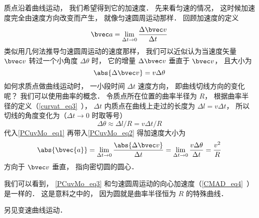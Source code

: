 


质点沿着曲线运动， 我们希望得到它的加速度． 先来看匀速的情况， 这时候加速度完全由速度方向改变而产生， 就像匀速圆周运动那样． 回顾加速度的定义
\begin{equation}\label{PCuvMo_eq2}
\bvec a = \lim_{\Delta t \to 0} \frac{\Delta \bvec v}{\Delta t}
\end{equation}
类似用几何法推导匀速圆周运动的速度那样， 我们可以近似认为当速度矢量 $\bvec v$ 转过一个小角度 $\Delta \theta$ 时， 它的增量 $\Delta \bvec v$ 垂直于 $\bvec v$， 且大小为
\begin{equation}\label{PCuvMo_eq1}
\abs{\Delta \bvec v} = v\Delta\theta
\end{equation}
如何求质点做曲线运动时， 一小段时间 $\Delta t$ 速度方向， 即曲线切线方向的变化呢？ 我们可以使用曲率的概念． 令质点所在位置的曲率半径为 $R$， 根据曲率半径的定义（\autoref{curvat_eq3}~）， $\Delta t$ 内质点在曲线上走过的长度为 $\Delta l = v \Delta t$， 所以切线的角度变化为（$\Delta t\to 0$ 时取等号）
\begin{equation}
\Delta \theta \approx \Delta l/R = v \Delta t/R
\end{equation}
代入\autoref{PCuvMo_eq1} 再带入\autoref{PCuvMo_eq2} 得加速度大小为
\begin{equation}\label{PCuvMo_eq3}
\abs{\bvec{a}} = \lim_{\Delta t \to 0} \frac{\abs{\Delta \bvec v}}{\Delta t}
= \lim_{\Delta t \to 0}  \frac{v\Delta\theta}{\Delta t} = \frac{v^2}{R}
\end{equation}
方向于 $\bvec v$ 垂直， 指向密切圆的圆心．

我们可以看到， \autoref{PCuvMo_eq3} 和匀速圆周运动的向心加速度（\autoref{CMAD_eq4}~）是一样的． 这是意料之中的， 因为圆就是曲率半径恒为 $R$ 的特殊曲线．

另见变速曲线运动．
